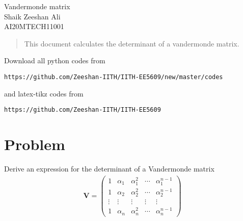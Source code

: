 \documentclass[journal,12pt,twocolumn]{IEEEtran}
\newcommand{\myvec}[1]{\ensuremath{\begin{pmatrix}#1\end{pmatrix}}}
\numberwithin{equation}{subsection}
\let\vec\mathbf
\begin{document}
\begin{center}
\huge Vandermonde matrix\\

\large Shaik Zeeshan Ali\\
\large AI20MTECH11001\\
\end{center}
\begin{abstract}
This document calculates the determinant of a vandermonde matrix.
\end{abstract}
Download all python codes from 
\begin{lstlisting}
https://github.com/Zeeshan-IITH/IITH-EE5609/new/master/codes
\end{lstlisting}

and latex-tikz codes from 
\begin{lstlisting}
https://github.com/Zeeshan-IITH/IITH-EE5609
\end{lstlisting}
\section{Problem}
Derive an expression for the determinant of a Vandermonde matrix
\begin{align}
    \vec{V}=\myvec{1&\alpha_1&\alpha_1^2&\cdots&\alpha_1^{n-1}\\1&\alpha_2&\alpha_2^2&\cdots&\alpha_2^{n-1}\\\vdots&\vdots&\vdots&\vdots&\vdots\\1&\alpha_n&\alpha_n^2&\cdots&\alpha_n^{n-1}}
\end{align}
\end{document}
